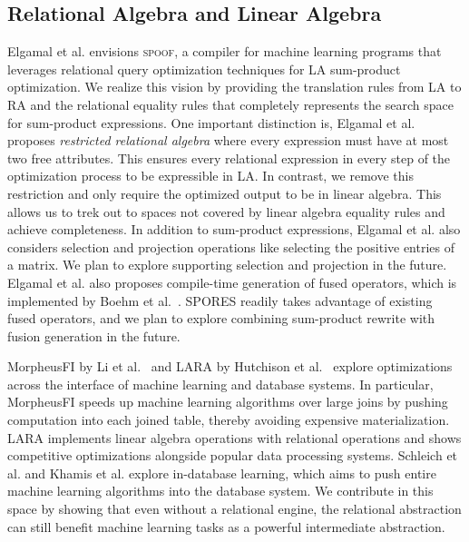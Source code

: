 \subsection{Relational Algebra and Linear Algebra}
Elgamal et al. \cite{ElgamalLBETRS17} envisions \textsc{spoof}, a compiler for machine learning programs
that leverages relational query optimization techniques for LA sum-product optimization. 
We realize this vision by providing the translation
rules from LA to RA and the relational equality rules that completely represents
the search space for sum-product expressions. One important distinction is, Elgamal
et al. proposes \emph{restricted relational algebra} where every expression must
have at most two free attributes. This ensures every relational expression in every step of the
optimization process to be expressible in LA. In contrast, we remove this restriction and only require the 
optimized output to be in linear algebra. This allows us to trek out to spaces not
covered by linear algebra equality rules and achieve completeness. In addition 
to sum-product expressions, Elgamal et al. also considers selection and projection operations
like selecting the positive entries of a matrix. We plan to explore supporting
selection and projection in the future. Elgamal et al. also proposes compile-time generation of
fused operators, which is implemented by Boehm et al.~\cite{DBLP:journals/pvldb/BoehmRHSEP18}.  SPORES readily takes advantage of existing fused operators, and we
plan to explore combining sum-product rewrite with fusion generation in the future. 

MorpheusFI by Li et al.~\cite{DBLP:conf/sigmod/LiC019} and LARA by Hutchison et al.~\cite{DBLP:journals/corr/HutchisonHS17} explore optimizations across the interface of machine learning and database systems. In particular, MorpheusFI speeds up machine learning algorithms over large joins by pushing computation into each joined table, thereby avoiding expensive
materialization. LARA implements linear algebra operations with relational operations and
shows competitive optimizations alongside popular data processing systems. 
Schleich et al.\cite{DBLP:conf/sigmod/SchleichOC16} and Khamis et al.\cite{DBLP:journals/corr/NgoNOS17} explore in-database learning, which aims to push entire
machine learning algorithms into the database system. 
We contribute in this space by showing that even without a relational engine, the
relational abstraction can still benefit machine learning tasks as a powerful
intermediate abstraction. 

